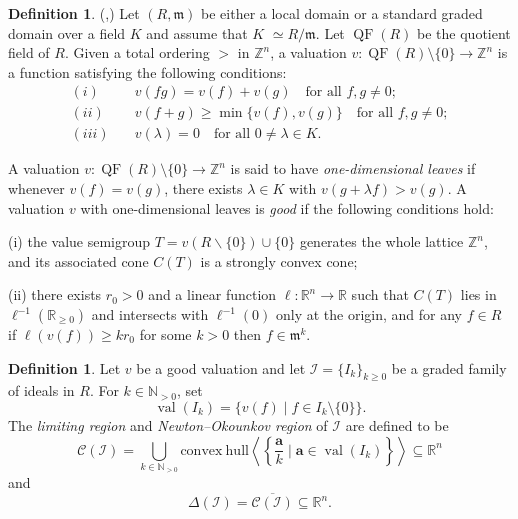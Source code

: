 \documentclass[11pt,reqno,a4paper]{amsart}
\theoremstyle{definition}
\newtheorem{definition}[theorem]{Definition}
\begin{document}
\begin{definition}(\cite [Section 2]{HaNguyenNguyen25},\cite[Section 8]{KavehKhovanskii14})
Let $(R,\mathfrak{m})$ be either a local domain or a standard graded domain over a field   ${K}$ and assume that ${K}$ $\simeq R / \mathfrak{m}$.
Let $\operatorname{QF}(R)$ be the quotient field of $R$.
Given a total ordering $>$ in $\mathbb{Z}^{n}$, a valuation $v:\operatorname{QF}(R) \setminus \{0\} \to \mathbb{Z}^{n}$ is a function satisfying the following conditions:
\begin{align*}
(i) &\quad v(fg) = v(f) + v(g) \quad \text{for all } f,g\neq 0; \\
(ii) &\quad v(f + g)\geq \min \{v(f),v(g)\} \quad \text{for all } f,g\neq 0; \\
(iii) &\quad v(\lambda) = 0 \quad \text{for all } 0\neq \lambda \in {K}.
\end{align*}

\end{definition}



A valuation $v:\operatorname{QF}(R) \setminus \{0\}\to \mathbb{Z}^{n}$ is said to have \emph{one-dimensional leaves} if whenever $v(f) = v(g)$, there exists $\lambda \in {K}$ with $v(g + \lambda f) > v(g)$. 
A valuation $v$ with one-dimensional leaves is \emph{good} if the following conditions hold:



\noindent (i) the value semigroup $T = v(R\backslash \{0\})\cup \{0\}$ generates the whole lattice $\mathbb{Z}^{n}$, and its associated cone $C(T)$ is a strongly convex cone;

\noindent (ii) there exists $r_0 > 0$ and a linear function $\ell :\mathbb{R}^{n}\to \mathbb{R}$ such that $C(T)$ lies in $\ell^{-1}(\mathbb{R}_{\geq 0})$ and intersects with $\ell^{-1}(0)$ only at the origin, and for any $f\in R$ if $\ell (v(f))\geq k r_{0}$ for some $k > 0$ then $f\in \mathfrak{m}^{k}$.



\begin{definition}
Let $v$ be a good valuation and let  $\mathcal{I} = \{I_k\}_{k \ge 0}$ be a graded family of ideals in $R$.
For $k\in \mathbb{N}_{>0}$, 
set
\[
\operatorname{val}(I_k) = \{v(f)\mid f\in I_{k}\setminus \{0\} \}.
\]
The \emph{limiting region} and \emph{Newton--Okounkov region} of $\mathcal{I}$ are defined to be
\[
\mathcal{C}(\mathcal{I}) = \bigcup_{k\in \mathbb{N}_{>0}}\mathrm{convex~hull}\left\langle \left\{\frac{\mathbf{a}}{k}\mid \mathbf{a}\in \operatorname{val}(I_k)\right\} \right\rangle \subseteq \mathbb{R}^{n}
\]
and
\[
\Delta (\mathcal{I}) = \overline{\mathcal{C}(\mathcal{I})}\subseteq \mathbb{R}^{n}.
\]


\end{definition}
\end{document}
